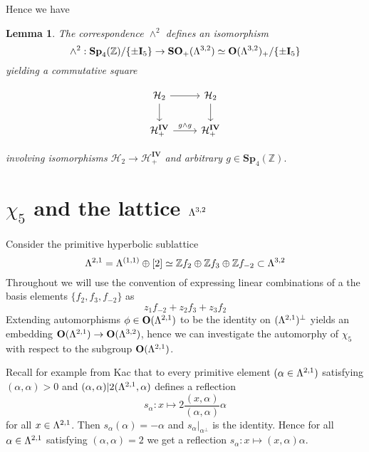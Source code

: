 \documentclass[9pt]{amsart} \usepackage[utf8]{inputenc}
\newtheorem{lemma}{Lemma}
\newcommand{\Z}{\mathbb{Z}} \newcommand{\C}{\mathbb{C}}
\newcommand{\HypPlan}{\Lambda^{(1,1)}}
\newcommand{\Sp}{\mathbf{Sp}}
\newcommand{\Orth}{\mathbf{O}}
\newcommand{\SO}{\mathbf{SO}}
\newcommand{\Hpl}{\mathcal{H}}
\newcommand{\IV}{\mathbf{IV}}
\newcommand{\Id}{\mathbf{I}}
\begin{document}
Hence we have

\begin{lemma}
The correspondence $\wedge^2$ defines an isomorphism $$\wedge^2 :
\Sp_4(\Z)/\{\pm \Id_5\} \rightarrow \SO_+(\La^{3,2}) \simeq
\Orth(\La^{3,2})_+/\{\pm\Id_5\}$$ yielding a commutative square

  \[ \begin{tikzcd}
\Hpl_2 \arrow{r}{} \arrow[swap]{d}{} & \Hpl_2 \arrow{d}{} \\%
\Hpl_+^{\IV} \arrow{r}{g \wedge g}& \Hpl_+^{\IV}
\end{tikzcd}
\]


involving isomorphisms $\Hpl_2 \rightarrow \Hpl_+^{\IV}$ and arbitrary
$g \in \Sp_4(\Z).$

\end{lemma}

\section{$\chi_5$ and the lattice $\Lambda^{3,2}$}

Consider the primitive hyperbolic sublattice
$$\La^{2,1} = \HypPlan \oplus [2] \simeq \Z f_2 \oplus \Z f_3 \oplus \Z
f_{-2} \subset \La^{3,2}$$
Throughout we will use the convention of expressing linear combinations
of a the basis elements $\{f_2,f_3,f_{-2}\}$ as
$$z_1 f_{-2} + z_2 f_3 + z_3 f_2$$
Extending automorphisms $\phi \in \Orth(\La^{2,1})$ to be the identity
on $(\Lambda^{2,1})^{\perp}$ yields an embedding $\Orth(\La^{2,1})
\rightarrow \Orth(\La^{3,2})$, hence we can investigate the automorphy
of $\chi_5$ with respect to the subgroup $\Orth(\La^{2,1})$.


Recall for example from Kac \cite{KAC:1} that to every primitive element $(\alpha \in
\Lambda^{2,1})$ satisfying $(\alpha,\alpha) > 0$ and $(\alpha, \alpha) |
2(\Lambda^{2,1}, \alpha)$ defines a reflection $$s_{\alpha}: x \mapsto
2\frac{(x,\alpha)}{(\alpha, \alpha)}\alpha$$ for all $x \in \Lambda^{2,1}$. Then
$s_{\alpha}(\alpha) = -\alpha$ and $s_{\alpha}|_{\alpha^{\perp}}$ is the
identity. Hence for all $\alpha \in \Lambda^{2,1}$ satisfying
$(\alpha,\alpha) = 2$ we get a reflection $s_{\alpha}: x \mapsto
(x,\alpha)\alpha$.
\end{document}

